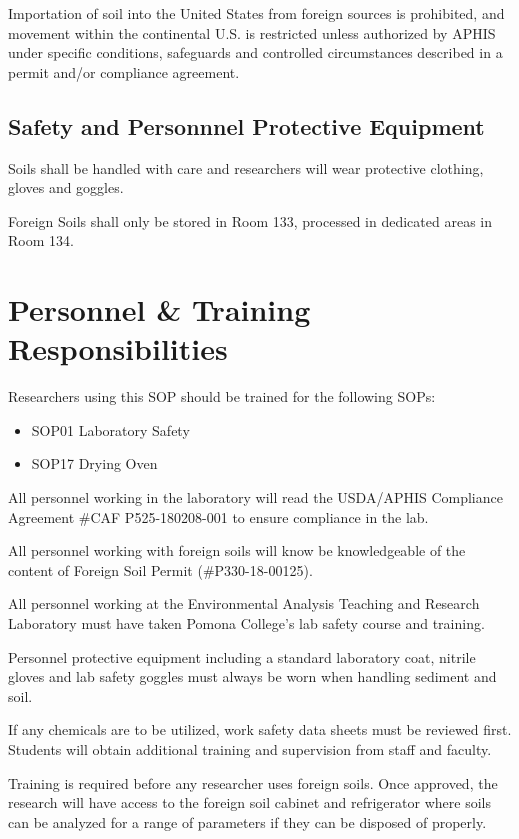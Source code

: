 \documentclass[12pt]{../SOP3}\usepackage[]{graphicx}\usepackage[]{color}
\begin{document}
\NP Importation of soil into the United States from foreign sources is prohibited, and movement within the continental U.S. is restricted unless authorized by APHIS under specific conditions, safeguards and controlled circumstances described in a permit and/or compliance agreement.


\subsection{Safety and Personnnel Protective Equipment}

\NP Soils shall be handled with care and researchers will wear protective clothing, gloves and goggles. 

\NP Foreign Soils shall only be stored in Room 133, processed in dedicated areas in Room 134.


\section{Personnel \& Training Responsibilities}

\NP Researchers using this SOP should be trained for the following SOPs:

\begin{itemize}
  \item SOP01 Laboratory Safety
  \item SOP17 Drying Oven
\end{itemize}

\NP All personnel working in the laboratory will read the USDA/APHIS Compliance Agreement \#CAF P525-180208-001 to ensure compliance in the lab.

\NP All personnel working with foreign soils will know be knowledgeable of the content of Foreign Soil Permit (\#P330-18-00125). 

\NP All personnel working at the Environmental Analysis Teaching and Research Laboratory must have taken Pomona College's lab safety course and training.

\NP Personnel protective equipment including a standard laboratory coat, nitrile gloves and lab safety goggles must always be worn when handling sediment and soil. 

\NP If any chemicals are to be utilized, work safety data sheets must be reviewed first. Students will obtain additional training and supervision from staff and faculty. 

\NP Training is required before any researcher uses foreign soils. Once approved, the research will have access to the foreign soil cabinet and refrigerator where soils can be analyzed for a range of parameters if they can be disposed of properly.  
\end{document}
